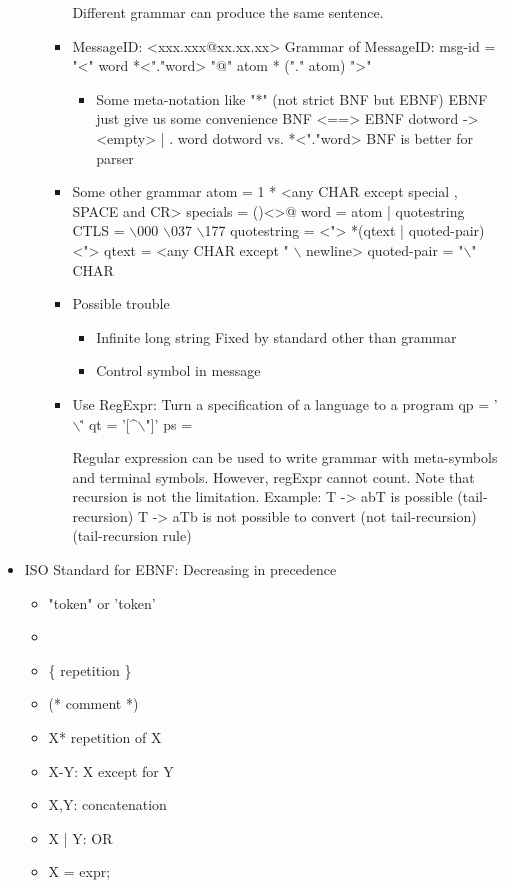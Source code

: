 \documentclass[11pt]{article}
\begin{document}
\begin{itemize}
\begin{itemize}
\begin{itemize}
Different grammar can produce the same sentence.

\item MessageID: <xxx.xxx@xx.xx.xx>
Grammar of MessageID:
msg-id = "<" word *<"."word> "@" atom * ("." atom) ">"

\begin{itemize}
\item Some meta-notation like "*" (not strict BNF but EBNF)
EBNF just give us some convenience
BNF <==> EBNF
dotword -> <empty> | . word dotword vs. *<"."word>
BNF is better for parser
\end{itemize}

\item Some other grammar
atom = 1 * <any CHAR except special , SPACE and CR>  
specials = ()<>@  
word = atom | quotestring
CTLS = $\backslash$000 $\backslash$037 $\backslash$177
quotestring = <"> *(qtext | quoted-pair) <">
qtext = <any CHAR except " $\backslash$ newline>
quoted-pair = "$\backslash$" CHAR

\item Possible trouble
\begin{itemize}
\item Infinite long string
Fixed by standard other than grammar

\item Control symbol in message
\end{itemize}

\item Use RegExpr: Turn a specification of a language to a program
qp = '$\backslash$\.'
qt = '[\^{}$\backslash$"]'
ps =

Regular expression can be used to write grammar with meta-symbols and terminal symbols.
However, regExpr cannot count.
Note that recursion is not the limitation.
Example: T -> abT is possible (tail-recursion)
	 T -> aTb is not possible to convert (not tail-recursion)
	 (tail-recursion rule)
\end{itemize}
\end{itemize}

\item ISO Standard for EBNF: Decreasing in precedence
\begin{itemize}
\item "token" or 'token'
\item\relax [ option ]
\item \{ repetition \}
\item (* comment *)
\item X* repetition of X
\item X-Y: X except for Y
\item X,Y: concatenation
\item X | Y: OR
\item X = expr;
\end{itemize}


\end{itemize}
\end{document}
